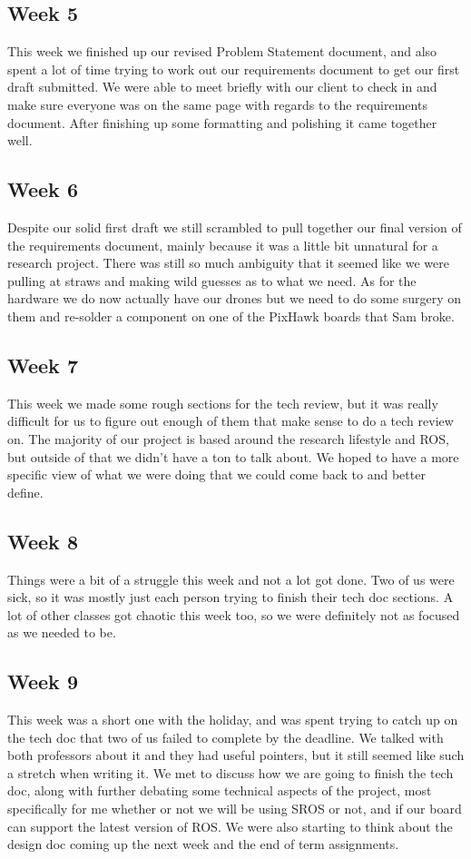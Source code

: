 \documentclass[IEEEtran,letterpaper,10pt,notitlepage,draftclsnofoot,onecolumn]{article}
\begin{document}
\subsection{Week 5}
This week we finished up our revised Problem Statement document, and also spent a lot of time trying to work out our requirements document to get our first draft submitted.
We were able to meet briefly with our client to check in and make sure everyone was on the same page with regards to the requirements document.
After finishing up some formatting and polishing it came together well.

\subsection{Week 6}
Despite our solid first draft we still scrambled to pull together our final version of the requirements document, mainly because it was a little bit unnatural for a research project.
There was still so much ambiguity that it seemed like we were pulling at straws and making wild guesses as to what we need.
As for the hardware we do now actually have our drones but we need to do some surgery on them and re-solder a component on one of the PixHawk boards that Sam broke.

\subsection{Week 7}
This week we made some rough sections for the tech review, but it was really difficult for us to figure out enough of them that make sense to do a tech review on.
The majority of our project is based around the research lifestyle and ROS, but outside of that we didn't have a ton to talk about.
We hoped to have a more specific view of what we were doing that we could come back to and better define.

\subsection{Week 8}
Things were a bit of a struggle this week and not a lot got done.
Two of us were sick, so it was mostly just each person trying to finish their tech doc sections.
A lot of other classes got chaotic this week too, so we were definitely not as focused as we needed to be.

\subsection{Week 9}
This week was a short one with the holiday, and was spent trying to catch up on the tech doc that two of us failed to complete by the deadline.
We talked with both professors about it and they had useful pointers, but it still seemed like such a stretch when writing it.
We met to discuss how we are going to finish the tech doc, along with further debating some technical aspects of the project, most specifically for me whether or not we will be using SROS or not, and if our board can support the latest version of ROS.
We were also starting to think about the design doc coming up the next week and the end of term assignments.
\end{document}
